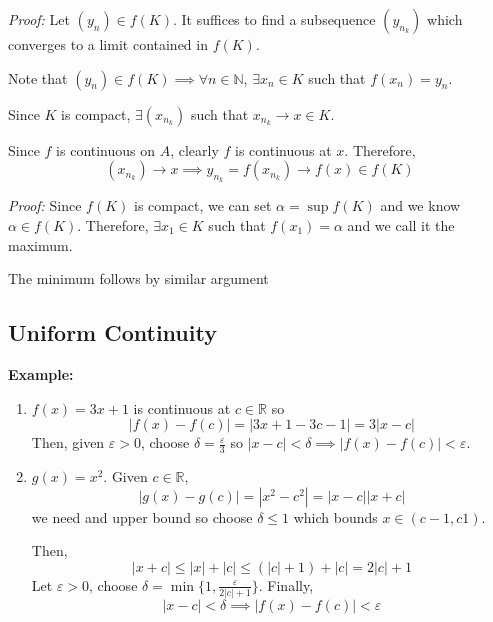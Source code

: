 \documentclass[12pt]{report}
\newcommand{\R}{\mathbb{R}}
\newcommand{\N}{\mathbb{N}}
\newcommand{\abs}[1]{\left\vert #1 \right\vert}
\newcommand{\ep}{\varepsilon}
\newenvironment*{tbox}[2][gray]{
    \begin{tcolorbox}[
        parbox=false,
        colback=#1!5!white,
        colframe=#1!75!black,
        breakable,
        title={#2}
    ]}
    {\end{tcolorbox}}
\begin{document}
        \begin{tbox}{\textbf{Theorem (Preservation of Compact Sets):} Let $f: A \to \R$ be continuous on $A$. If $K \subseteq A$ is compact, then $f(K)$ is compact.}
            \emph{Proof:} Let $(y_n) \in f(K)$. It suffices to find a subsequence $(y_{n_k})$ which converges to a limit contained in $f(K)$. 

            Note that $(y_n) \in f(K) \implies \forall n \in \N$, $\exists x_n \in K$ such that $f(x_n) = y_n$. 
            
            Since $K$ is compact, $\exists (x_{n_k})$ such that $x_{n_k} \to x \in K$.

            Since $f$ is continuous on $A$, clearly $f$ is continuous at $x$. Therefore,
            \[(x_{n_k}) \to x \implies y_{n_k} = f(x_{n_k}) \to f(x) \in f(K)\]
        \end{tbox}

        \begin{tbox}{\textbf{Extreme Value Theorem:} If $f: K \to \R$ is continuous on a compact set $K \subseteq \R$, then $f$ attain a maximum and minimum value, i.e. $\exists x_0, x_1 \in K$ such that $f(x_0) \leq f(x) \leq f(x_1)$ for all $x \in K$. }
            \emph{Proof:} Since $f(K)$ is compact, we can set $\alpha = \sup f(K)$ and we know $\alpha \in f(K)$. Therefore, $\exists x_1 \in K$ such that $f(x_1) = \alpha$ and we call it the maximum.

            The minimum follows by similar argument
        \end{tbox}

    \subsection*{Uniform Continuity}
        \textbf{Example:} 
        \begin{enumerate}
            \item $f(x) = 3x + 1$ is continuous at $c \in \R$ so 
            \[\abs{f(x) - f(c)} = \abs{3x + 1 - 3c - 1} = 3\abs{x - c}\] 
            Then, given $\ep > 0$, choose $\delta = \frac{\ep}{3}$ so $\abs{x - c} < \delta \implies \abs{f(x) - f(c)} < \ep$.

            \item $g(x) = x^2$. Given $c \in \R$, 
            \[\abs{g(x) - g(c)} = \abs{x^2 - c^2} = \abs{x - c}\abs{x + c}\]
            we need and upper bound so choose $\delta \leq 1$ which bounds $x \in (c - 1, c  1)$. 

            Then, 
            \[\abs{x + c} \leq \abs{x} + \abs{c} \leq (\abs{c} + 1) + \abs{c}= 2\abs{c} +1\]
            Let $\ep > 0$, choose $\delta = \min\{1, \frac{\ep}{2\abs{c} + 1}\}$. Finally, 
            \[\abs{x - c} < \delta \implies \abs{f(x) - f(c)} < \ep\]
        \end{enumerate}
\end{document}
